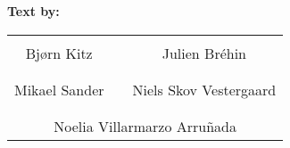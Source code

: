 \textbf{Text by:}\\
\vspace{-5pt}
\begin{table}[H]
	\centering
		\begin{tabular}{c c c}
			\underline{\phantom{JAERJAERJAERJAERGO}} & \phantom{cookies} & \underline{\phantom{JAERJAERJAERJAERGO}} \\
			Bjørn Kitz			& \phantom{cookies} & Julien Br\'ehin		\\
			&&\\
			\underline{\phantom{JAERJAERJAERJAERGO}} & \phantom{cookies} & \underline{\phantom{JAERJAERJAERJAERGO}} \\
			Mikael Sander			& \phantom{cookies} & Niels Skov Vestergaard		\\
			&&\\
	    \multicolumn{3}{c}{\underline{\phantom{JAERJAERJAERJAERGO}}}\\
	    \multicolumn{3}{c}{Noelia Villarmarzo Arruñada}\\				
		\end{tabular}
\end{table}

\pagebreak
\restoregeometry